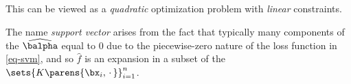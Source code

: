 \documentclass[12pt]{article}
\begin{document}
\begin{enumerate}[label=\textbf{\arabic*.}]
	This can be viewed as a \textit{quadratic} optimization problem with \textit{linear} constraints. 
	
	The name \textit{support vector} arises from the fact that typically many components of the $\widehat{\balpha}$ equal to 0 due to the piecewise-zero nature of the loss function in \eqref{eq-svm}, and so $\hat{f}$ is an expansion in a subset of the $\sets{K \parens{\bx_i, \,\cdot\,}}_{i=1}^n$. 

\end{enumerate}


%
%	
%	
%
%
\end{document}
